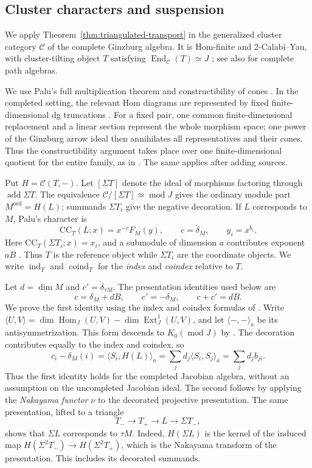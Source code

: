 \documentclass[11pt]{amsart}
\numberwithin{equation}{section}
\theoremstyle{definition}
\theoremstyle{remark}
\newcommand{\op}[1]{\operatorname{#1}}
\newcommand{\C}{\mathcal C}
\newcommand{\CC}{\mathrm{CC}}
\newcommand{\add}{\op{add}}
\newcommand{\Hom}{\op{Hom}}
\newcommand{\Ext}{\op{Ext}}
\newcommand{\End}{\op{End}}
\newcommand{\ind}{\op{ind}}
\newcommand{\dv}{\underline{\dim}}
\newcommand{\coind}{\op{coind}}
\begin{document}
\subsection{Cluster characters and suspension}
We apply Theorem~\ref{thm:triangulated-transport} in the generalized
cluster category $\C$ of the complete Ginzburg algebra. It is Hom-finite
and 2-Calabi--Yau, with cluster-tilting object $T$ satisfying
$\End_\C(T)\simeq J$ \cite[Theorem~3.5]{Ami09}; see also
\cite[Section~7.20]{KY11} for complete path algebras.

We use Palu's full multiplication theorem and constructibility of cones
\cite[Theorem~1.1 and Section~2.5]{Pal12}. In the completed setting, the
relevant Hom diagrams are represented by fixed finite-dimensional dg
truncations \cite[Theorem~2.19]{KY11}. For a fixed pair, one common
finite-dimensional replacement and a linear section represent the whole
morphism space; one power of the Ginzburg arrow ideal then annihilates
all representatives and their cones. Thus the constructibility argument
takes place over one finite-dimensional quotient for the entire family,
as in \cite[Section~2.5]{Pal12}. The same applies after adding sources.

Put $H=\C(T,-)$. Let $[\Sigma T]$ denote the ideal of morphisms
factoring through $\add\Sigma T$. The equivalence
$\C/[\Sigma T]\simeq\op{mod}J$
\cite[Proposition~2.1(c)]{KR07} gives the ordinary module part
$M^{\mathrm{ord}}=H(L)$; summands $\Sigma T_i$ give the negative
decoration. If $L$ corresponds to $M$, Palu's character is
\[ \CC_T(L;x)=x^{-c}F_M(y),\qquad c=\check\delta_M,\qquad y_i=x^{b_i}. \]
Here $\CC_T(\Sigma T_i;x)=x_i$, and a submodule of dimension $a$
contributes exponent $aB$ \cite{Pal08,Pal12}. Thus $T$ is the reference
object while $\Sigma T_i$ are the coordinate objects. We write $\ind_T$
and $\coind_T$ for the \emph{index} and \emph{coindex} relative to $T$.

Let $d=\dv M$ and $c'=\check\delta_{\tau M}$. The presentation
identities used below are
\begin{equation}\label{eq:app-weights} c=\delta_M+dB,\qquad c'=-\delta_M,\qquad c+c'=dB.\end{equation}
We prove the first identity using the index and coindex formulas of
\cite[Lemma~2.3]{Pal08}. Write
$\langle U,V\rangle=\dim\Hom_J(U,V)-\dim\Ext^1_J(U,V)$, and
let $\langle-,-\rangle_a$ be its antisymmetrization. This form descends
to $K_0(\op{mod}J)$ by \cite[Theorem~3.4]{Pal08}.
The decoration contributes equally to the index and coindex, so
\[ c_i-\delta_M(i) =\langle S_i,H(L)\rangle_a =\sum_j d_j\langle S_i,S_j\rangle_a =\sum_j d_j b_{ji}. \]
Thus the first identity holds for the completed Jacobian algebra, without
an assumption on the uncompleted Jacobian ideal. The second follows by
applying the \emph{Nakayama functor} $\nu$ to the decorated projective
presentation.
The same presentation, lifted to a triangle
\[ T_-\longrightarrow T_+\longrightarrow L\longrightarrow\Sigma T_-, \]
shows that $\Sigma L$ corresponds to $\tau M$. Indeed,
$H(\Sigma L)$ is the kernel of the induced map
$H(\Sigma^2T_-)\to H(\Sigma^2T_+)$, which is the Nakayama
transform of the presentation. This includes its decorated summands.
\end{document}
